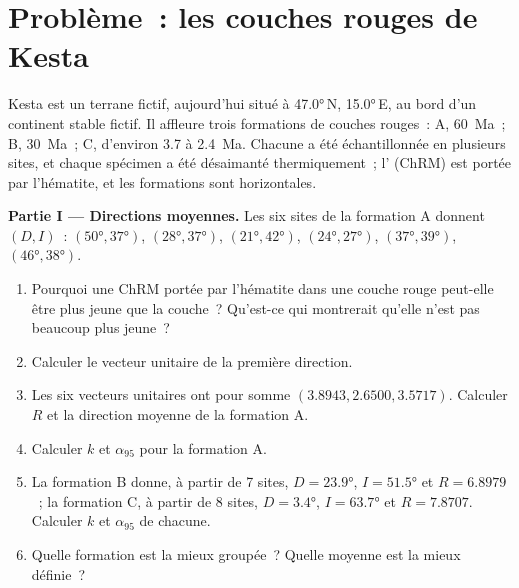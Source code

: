 \section{Problème~: les couches rouges de Kesta}

\begin{problem}
\label{pb:b3:palaeomagnetism:1}
Kesta est un terrane fictif, aujourd'hui situé à \ang{47.0}\,N, \ang{15.0}\,E, au bord
d'un continent stable fictif. Il affleure trois formations de couches rouges~: A,
\qty{60}{Ma}~; B, \qty{30}{Ma}~; C, d'environ 3.7 à \qty{2.4}{Ma}. Chacune a été
échantillonnée en plusieurs sites, et chaque spécimen a été désaimanté thermiquement~; l' (ChRM) est portée par l'hématite, et les formations sont horizontales.

\medskip\noindent\textbf{Partie I --- Directions moyennes.} Les six sites de
la formation A donnent $(D, I)$~: $(\ang{50}, \ang{37})$, $(\ang{28}, \ang{37})$,
$(\ang{21}, \ang{42})$, $(\ang{24}, \ang{27})$, $(\ang{37}, \ang{39})$,
$(\ang{46}, \ang{38})$.
\begin{enumerate}
  \item Pourquoi une ChRM portée par l'hématite dans une couche rouge peut-elle être plus jeune que la
        couche~? Qu'est-ce qui montrerait qu'elle n'est pas beaucoup plus jeune~?
  \item Calculer le vecteur unitaire de la première direction.
  \item Les six vecteurs unitaires ont pour somme $(3.8943, 2.6500, 3.5717)$. Calculer $R$ et
        la direction moyenne de la formation A.
  \item Calculer $k$ et $\alpha_{95}$ pour la formation A.
  \item La formation B donne, à partir de 7 sites, $D = \ang{23.9}$, $I = \ang{51.5}$ et
        $R = 6.8979$~; la formation C, à partir de 8 sites, $D = \ang{3.4}$, $I =
        \ang{63.7}$ et $R = 7.8707$. Calculer $k$ et $\alpha_{95}$ de chacune.
  \item Quelle formation est la mieux groupée~? Quelle moyenne est la mieux définie~?
\end{enumerate}


\end{problem}
